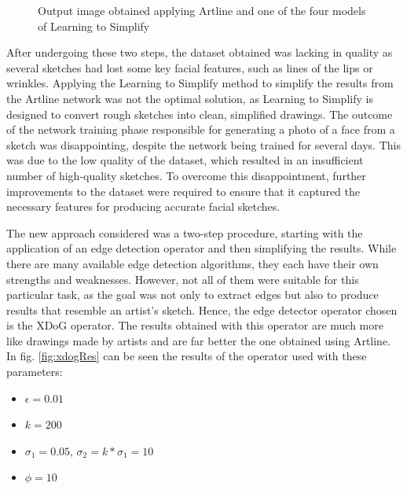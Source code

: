 \begin{figure}[htbp]
    \caption{Output image obtained applying Artline and one of the four models of Learning to Simplify}
    \label{fig:simplifyModelsRes}
\end{figure}

\noindent After undergoing these two steps, the dataset obtained was lacking in quality as several sketches had lost some key facial features, such as lines of the lips or wrinkles. Applying the Learning to Simplify method to simplify the results from the Artline network was not the optimal solution, as Learning to Simplify is designed to convert rough sketches into clean, simplified drawings. The outcome of the network training phase responsible for generating a photo of a face from a sketch was disappointing, despite the network being trained for several days. This was due to the low quality of the dataset, which resulted in an insufficient number of high-quality sketches. To overcome this disappointment, further improvements to the dataset were required to ensure that it captured the necessary features for producing accurate facial sketches.

\noindent The new approach considered was a two-step procedure, starting with the application of an edge detection operator and then simplifying the results. While there are many available edge detection algorithms, they each have their own strengths and weaknesses. However, not all of them were suitable for this particular task, as the goal was not only to extract edges but also to produce results that resemble an artist’s sketch. Hence, the edge detector operator chosen is the XDoG operator. The results obtained with this operator are much more like drawings made by artists and are far better the one obtained using Artline. In fig. \ref{fig:xdogRes} can be seen the results of the operator used with these parameters:
\begin{itemize}
    \item $\epsilon = 0.01$
    \item $k = 200$
    \item $\sigma_1 = 0.05$,  $\sigma_2=k * \sigma_1 = 10$
    \item $\phi = 10$
\end{itemize}

